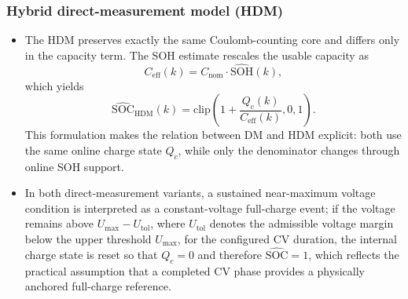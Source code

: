 \documentclass[review,nopreprintline]{elsarticle}
\begin{document}
\subsubsection{Hybrid direct-measurement model (HDM)}
\begin{itemize}[leftmargin=*]
    \item The HDM preserves exactly the same Coulomb-counting core and differs only in the capacity term. The SOH estimate rescales the usable capacity as
    \begin{equation}
        C_{\mathrm{eff}}(k)=C_{\mathrm{nom}} \cdot \widehat{\mathrm{SOH}}(k),
        \label{eq:ceff}
    \end{equation}
    which yields
    \begin{equation}
        \widehat{\mathrm{SOC}}_{\mathrm{HDM}}(k)=\mathrm{clip}\!\left(1+\frac{Q_c(k)}{C_{\mathrm{eff}}(k)},0,1\right).
        \label{eq:soc_hdm}
    \end{equation}
    This formulation makes the relation between DM and HDM explicit: both use the same online charge state $Q_c$, while only the denominator changes through online SOH support.
    \item In both direct-measurement variants, a sustained near-maximum voltage condition is interpreted as a constant-voltage full-charge event; if the voltage remains above $U_{\max}-U_{\mathrm{tol}}$, where $U_{\mathrm{tol}}$ denotes the admissible voltage margin below the upper threshold $U_{\max}$, for the configured CV duration, the internal charge state is reset so that $Q_c=0$ and therefore $\widehat{\mathrm{SOC}}=1$, which reflects the practical assumption that a completed CV phase provides a physically anchored full-charge reference.
\end{itemize}
\end{document}
